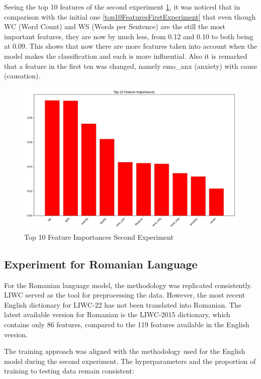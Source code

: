 Seeing the top 10 features of the second experiment \ref{top10FeaturesSecondExperiment}, it was noticed that in comparison with the initial one \ref{top10FeaturesFirstExperiment} that even though WC (Word Count) and WS (Words per Sentence) are the still the most important features, they are now by much less, from 0.12 and 0.10 to both being at 0.09. This shows that now there are more features taken into account when the model makes the classification and each is more influential. Also it is remarked that a feature in the first ten was changed, namely emo\_anx (anxiety) with cause (causation).

\begin{figure}[htbp]
	\centering
		\includegraphics[scale=0.5]{LaTeX Bachelor Thesis Depression Signs Detection/figures/metrics/experiment2English/top10features.jpg}
	\caption{Top 10 Feature Importances Second Experiment}
	\label{top10FeaturesSecondExperiment}
\end{figure}

\subsection{Experiment for Romanian Language}

\quad For the Romanian language model, the methodology was replicated consistently. LIWC served as the tool for preprocessing the data. However, the most recent English dictionary for LIWC-22 has not been translated into Romanian. The latest available version for Romanian is the LIWC-2015 dictionary, which contains only 86 features, compared to the 119 features available in the English version.

The training approach was aligned with the methodology used for the English model during the second experiment. The hyperparameters and the proportion of training to testing data remain consistent:

